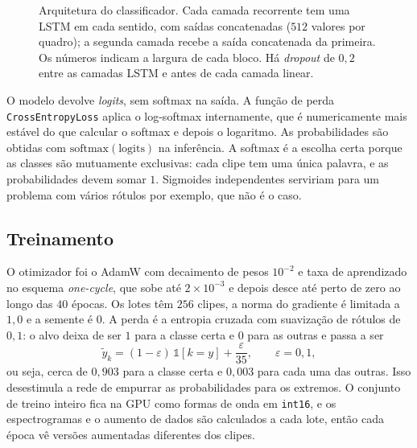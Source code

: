 \documentclass[11pt,a4paper]{article}
\begin{document}
\begin{figure}[H]
\caption{Arquitetura do classificador. Cada camada recorrente tem uma LSTM em cada sentido, com saídas concatenadas ($512$ valores por quadro); a segunda camada recebe a saída concatenada da primeira. Os números indicam a largura de cada bloco. Há \textit{dropout} de $0{,}2$ entre as camadas LSTM e antes de cada camada linear.}
\label{fig:model}
\end{figure}

O modelo devolve \textit{logits}, sem softmax na saída. A função de perda \texttt{CrossEntropyLoss} aplica o log-softmax internamente, que é numericamente mais estável do que calcular o softmax e depois o logaritmo. As probabilidades são obtidas com $\mathrm{softmax}(\text{logits})$ na inferência. A softmax é a escolha certa porque as classes são mutuamente exclusivas: cada clipe tem uma única palavra, e as probabilidades devem somar $1$. Sigmoides independentes serviriam para um problema com vários rótulos por exemplo, que não é o caso.

\subsection*{Treinamento}

O otimizador foi o AdamW com decaimento de pesos $10^{-2}$ e taxa de aprendizado no esquema \textit{one-cycle}, que sobe até $2 \times 10^{-3}$ e depois desce até perto de zero ao longo das $40$ épocas. Os lotes têm $256$ clipes, a norma do gradiente é limitada a $1{,}0$ e a semente é $0$. A perda é a entropia cruzada com suavização de rótulos de $0{,}1$: o alvo deixa de ser $1$ para a classe certa e $0$ para as outras e passa a ser
\begin{equation}
    \tilde{y}_k = (1 - \varepsilon)\,\mathbb{1}[k = y] + \frac{\varepsilon}{35}, \qquad \varepsilon = 0{,}1,
\end{equation}
ou seja, cerca de $0{,}903$ para a classe certa e $0{,}003$ para cada uma das outras. Isso desestimula a rede de empurrar as probabilidades para os extremos. O conjunto de treino inteiro fica na GPU como formas de onda em \texttt{int16}, e os espectrogramas e o aumento de dados são calculados a cada lote, então cada época vê versões aumentadas diferentes dos clipes.
\end{document}

